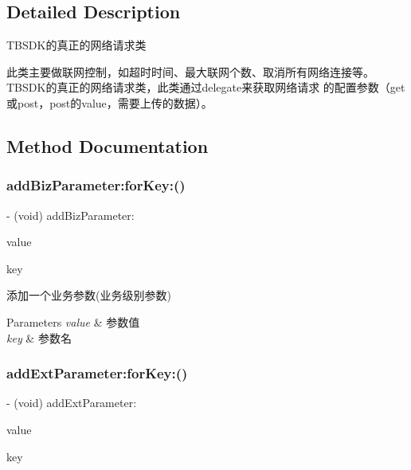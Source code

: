 \subsection{Detailed Description}
T\+B\+S\+D\+K的真正的网络请求类

此类主要做联网控制，如超时时间、最大联网个数、取消所有网络连接等。 T\+B\+S\+D\+K的真正的网络请求类，此类通过delegate来获取网络请求 的配置参数（get或post，post的value，需要上传的数据）。 

\subsection{Method Documentation}
\mbox{\label{interface_t_b_s_d_k_request_a6c06970c55e540ac093831c085af5ab0}} 
\subsubsection{\texorpdfstring{add\+Biz\+Parameter\+:for\+Key\+:()}{addBizParameter:forKey:()}}
{\footnotesize\ttfamily -\/ (void) add\+Biz\+Parameter\+: \begin{DoxyParamCaption}\item[{(id)}]{value }\item[{forKey:(N\+S\+String $\ast$)}]{key }\end{DoxyParamCaption}}

添加一个业务参数(业务级别参数) 
\begin{DoxyParams}{Parameters}
{\em value} & 参数值 \\
\hline
{\em key} & 参数名 \\
\hline
\end{DoxyParams}
\mbox{\label{interface_t_b_s_d_k_request_afbdaba94fcf578f6ceb298ce593f9f23}} 
\subsubsection{\texorpdfstring{add\+Ext\+Parameter\+:for\+Key\+:()}{addExtParameter:forKey:()}}
{\footnotesize\ttfamily -\/ (void) add\+Ext\+Parameter\+: \begin{DoxyParamCaption}\item[{(id)}]{value }\item[{forKey:(N\+S\+String $\ast$)}]{key }\end{DoxyParamCaption}}

